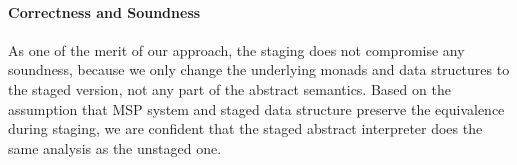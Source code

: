 
\paragraph{Correctness and Soundness}

As one of the merit of our approach, the staging does not compromise any
soundness, because we only change the underlying monads and data structures to
the staged version, not any part of the abstract semantics. Based on the
assumption that MSP system and staged data structure preserve the equivalence
during staging, we are confident that the staged abstract interpreter does the
same analysis as the unstaged one.

